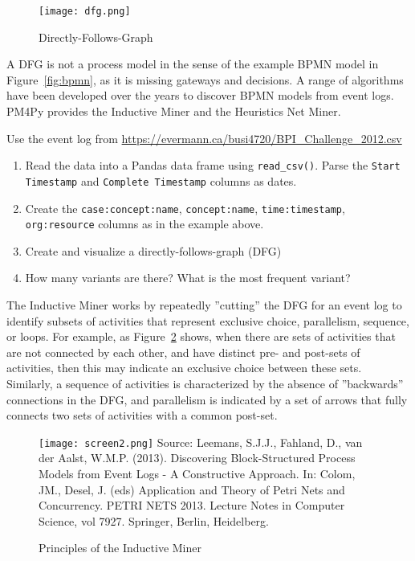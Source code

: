 \begin{figure}
\centering
\texttt{[image: dfg.png]}
\caption{Directly-Follows-Graph}
\label{fig:dfg}
\end{figure}

A DFG is not a process model in the sense of the example BPMN model in Figure~\ref{fig:bpmn}, as it is missing gateways and decisions. A range of algorithms have been developed over the years to discover BPMN models from event logs. PM4Py provides the Inductive Miner and the Heuristics Net Miner. 

\begin{exercisebox}
Use the event log from \small\url{https://evermann.ca/busi4720/BPI_Challenge_2012.csv}\normalsize
\begin{enumerate}
   \item Read the data into a Pandas data frame using \texttt{read\_csv()}. Parse the \texttt{Start Timestamp} and \texttt{Complete Timestamp} columns as dates.
   \item Create the \texttt{case:concept:name}, \texttt{concept:name}, \texttt{time:timestamp}, \texttt{org:resource} columns as in the example above.
   \item Create and visualize a directly-follows-graph (DFG)
   \item How many variants are there? What is the most frequent variant?
\end{enumerate}
\end{exercisebox}

The Inductive Miner works by repeatedly ''cutting'' the DFG for an event log to identify subsets of activities that represent exclusive choice, parallelism, sequence, or loops. For example, as Figure~\ref{fig:inductive} shows, when there are sets of activities that are not connected by each other, and have distinct pre- and post-sets of activities, then this may indicate an exclusive choice between these sets. Similarly, a sequence of activities is characterized by the absence of ''backwards'' connections in the DFG, and parallelism is indicated by a set of arrows that fully connects two sets of activities with a common post-set. 

\begin{figure}
\texttt{[image: screen2.png]}
\scriptsize 
Source: Leemans, S.J.J., Fahland, D., van der Aalst, W.M.P. (2013). Discovering Block-Structured Process Models from Event Logs - A Constructive Approach. In: Colom, JM., Desel, J. (eds) Application and Theory of Petri Nets and Concurrency. PETRI NETS 2013. Lecture Notes in Computer Science, vol 7927. Springer, Berlin, Heidelberg.
\caption{Principles of the Inductive Miner}
\label{fig:inductive}
\end{figure}

